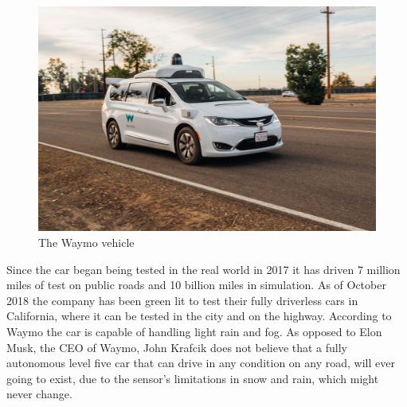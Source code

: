 \begin{figure}[H]
\centering
\includegraphics[width=\textwidth]{Figures/ConAnalysis/Market/Waymo.jpg}
\caption{The Waymo vehicle}
\label{fig:Waymo}
\end{figure}
\noindent Since the car began being tested in the real world in 2017 it has driven 7 million miles of test on public roads and 10 billion miles in simulation. As of October 2018 the company has been green lit to test their fully driverless cars in California, where it can be tested in the city and on the highway. According to Waymo the car is capable of handling light rain and fog. %
As opposed to Elon Musk, the CEO of Waymo, John Krafcik does not believe that a fully autonomous level five car that can drive in any condition on any road, will ever going to exist, due to the sensor's limitations in snow and rain, which might never change. %

